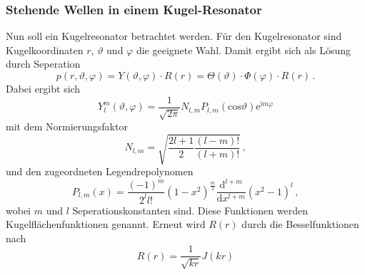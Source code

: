 %
%
%
%
%
%
%
\subsubsection{Stehende Wellen in einem Kugel-Resonator}
Nun soll ein Kugelresonator betrachtet werden. 
Für den Kugelresonator sind Kugelkoordinaten $r$, $\vartheta$ und $\varphi$ die geeignete Wahl.
Damit ergibt sich als Lösung durch Seperation
\begin{equation*}
    p\left(r,\vartheta, \varphi \right) = Y\left(\vartheta, \varphi\right)\cdot R\left(r\right) = \Theta\left(\vartheta\right) \cdot \Phi\left(\varphi\right)\cdot R\left(r\right)\, .
\end{equation*}
Dabei ergibt sich
\begin{equation}
    Y_l^m\left(\vartheta, \varphi\right) = \frac{1}{\sqrt{2 \pi}}N_{l,m} P_{l,m} \left(\mathrm{cos}\vartheta\right) \mathrm{e}^{\mathrm{i} m \varphi}
    \label{eqn:kugelflaech}
\end{equation}
mit dem Normierungsfaktor 
\begin{equation*}
    N_{l,m} = \sqrt{\frac{2l+1}{2} \frac{\left(l-m\right)!}{\left(l+m\right)!}}\, ,
\end{equation*}
und den zugeordneten Legendrepolynomen 
\begin{equation*}
    P_{l,m} \left(x\right) = \frac{\left(-1\right)^m}{2^l l!} \left(1-x^2\right)^{\frac{m}{2}} \frac{\mathrm{d}^{l+m}}{\mathrm{d}x^{l+m}} \left(x^2 -1\right)^l \, ,
\end{equation*}
wobei $m$ und $l$ Seperationskonstanten sind.
Diese Funktionen werden Kugelflächenfunktionen genannt.
Erneut wird $R\left(r\right)$ durch die Besselfunktionen nach
\begin{equation*}
    R\left(r\right) = \frac{1}{\sqrt{kr}} J \left(k r\right)
\end{equation*}
